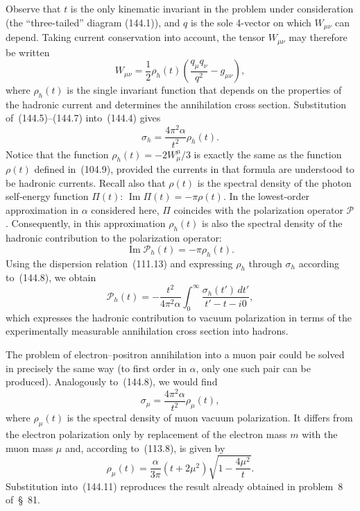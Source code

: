 Observe that $t$ is the only kinematic invariant in the problem under consideration (the ``three-tailed'' diagram
(144.1)), and $q$ is the sole 4-vector on which $W_{\mu\nu}$ can depend. Taking current conservation into account, the tensor $W_{\mu\nu}$ may therefore be written
\begin{equation}
W_{\mu\nu}=\frac12\rho_h(t)\left(\frac{q_\mu q_\nu}{q^2}-g_{\mu\nu}\right),
\tag{144.7}
\end{equation}
where $\rho_h(t)$ is the single invariant function that depends on the properties of the hadronic current and determines the annihilation cross section. Substitution of~(144.5)--(144.7) into~(144.4) gives
\begin{equation}
\sigma_h=\frac{4\pi^2\alpha}{t^2}\rho_h(t).
\tag{144.8}
\end{equation}
Notice that the function $\rho_h(t)=-2W^\mu_\mu/3$ is exactly the same as the function $\rho(t)$ defined in~(104.9), provided the currents in that formula are understood to be hadronic currents. Recall also that $\rho(t)$ is the spectral density of the photon self-energy function $\Pi(t)$: $\operatorname{Im}\Pi(t)=-\pi\rho(t)$. In the lowest-order approximation in $\alpha$ considered here, $\Pi$ coincides with the polarization operator $\mathcal P$. Consequently, in this approximation $\rho_h(t)$ is also the spectral density of the hadronic contribution to the polarization operator:
\begin{equation}
\operatorname{Im}\mathcal P_h(t)=-\pi\rho_h(t).
\tag{144.9}
\end{equation}
Using the dispersion relation~(111.13) and expressing $\rho_h$ through $\sigma_h$ according to~(144.8), we obtain
\begin{equation}
\mathcal P_h(t)=-\frac{t^2}{4\pi^2\alpha}
\int_0^\infty\frac{\sigma_h(t')\,dt'}{t'-t-i0},
\tag{144.10}
\end{equation}
which expresses the hadronic contribution to vacuum polarization in terms of the experimentally measurable annihilation cross section into hadrons.

The problem of electron--positron annihilation into a muon pair could be solved in precisely the same way (to first order in $\alpha$, only one such pair can be produced). Analogously to~(144.8), we would find
\begin{equation}
\sigma_\mu=\frac{4\pi^2\alpha}{t^2}\rho_\mu(t),
\tag{144.11}
\end{equation}
where $\rho_\mu(t)$ is the spectral density of muon vacuum polarization. It differs from the electron polarization only by replacement of the electron mass $m$ with the muon mass $\mu$ and, according to~(113.8), is given by
\[
\rho_\mu(t)=\frac{\alpha}{3\pi}(t+2\mu^2)\sqrt{1-\frac{4\mu^2}{t}}.
\]
Substitution into~(144.11) reproduces the result already obtained in problem~8 of~\S~81.
